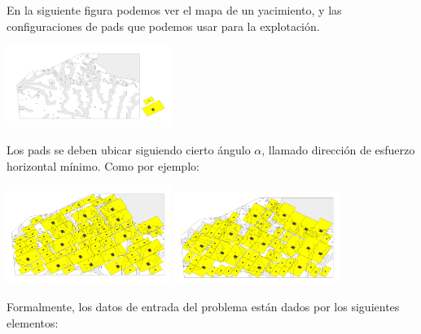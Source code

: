 En la siguiente figura podemos ver  el mapa de un yacimiento, y las configuraciones de pads que
podemos usar para la explotaci\'on.

\begin{center}
\includegraphics[width=0.4\textwidth]{imagenes/figura4}
\end{center}

Los pads se deben ubicar siguiendo cierto \'angulo $\alpha$, llamado direcci\'on de esfuerzo horizontal m\'inimo.
Como por ejemplo:

\begin{center}
\includegraphics[width=0.4\textwidth]{imagenes/figura5}
\includegraphics[width=0.4\textwidth]{imagenes/figura6}
\end{center}

Formalmente, los datos de entrada del problema est\'an dados por los siguientes
elementos:

